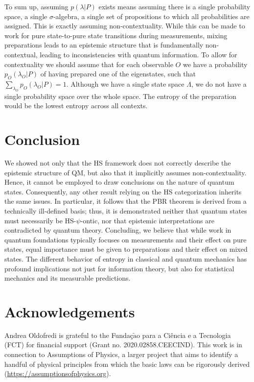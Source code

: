 \documentclass[twocolumn,prl,floatfix,superscriptaddress]{revtex4-2}
\begin{document}
To sum up, assuming $p(\lambda|P)$ exists means assuming there is a single probability space, a single $\sigma$-algebra, a single set of propositions to which all probabilities are assigned. This is exactly assuming non-contextuality. While this can be made to work for pure state-to-pure state transitions during measurements, mixing preparations leads to an epistemic structure that is fundamentally non-contextual, leading to inconsistencies with quantum information. To allow for contextuality we should assume that for each observable $O$ we have a probability $p_O(\lambda_O|P)$ of having prepared one of the eigenstates, such that $\sum_{\lambda_O} p_O(\lambda_O|P) = 1$. Although we have a single state space $\Lambda$, we do not have a single probability space over the whole space. The entropy of the preparation would be the lowest entropy across all contexts.

\section{Conclusion}

We showed not only that the HS framework does not correctly describe the epistemic structure of QM, but also that it implicitly assumes non-contextuality. Hence, it cannot be employed to draw conclusions on the nature of quantum states. Consequently, any other result relying on the HS categorization inherits the same issues. In particular, it follows that the PBR theorem is derived from a technically ill-defined basis; thus, it is demonstrated neither that quantum states must necessarily be HS-$\psi$-ontic, nor that epistemic interpretations are contradicted by quantum theory. Concluding, we believe that while work in quantum foundations typically focuses on measurements and their effect on pure states, equal importance must be given to preparations and their effect on mixed states. The different behavior of entropy in classical and quantum mechanics has profound implications not just for information theory, but also for statistical mechanics and its measurable predictions. 



\section{Acknowledgements}

Andrea Oldofredi is grateful to the Funda\c{c}$\tilde{\mathrm{a}}$o para a Ci\^encia e a Tecnologia (FCT) for financial support (Grant no. 2020.02858.CEECIND).  This work is in connection to Assumptions of Physics, a larger project that aims to identify a handful of physical principles from which the basic laws can be rigorously derived  (\url{https://assumptionsofphysics.org}).

%

\end{document}
